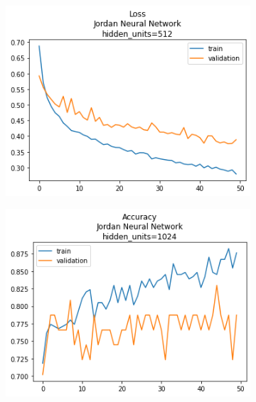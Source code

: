 \documentclass[12pt, a4paper]{article}
\begin{document}
\begin{figure}
\begin{subfigure}{0.45\linewidth}
    \end{subfigure}
    \hfill
    \begin{subfigure}{0.45\linewidth}
        \includegraphics[width=0.9\linewidth]{images/q1/jordan/loss_Jordan Neural Networkhidden_units=512.png}
    \end{subfigure}
    \begin{subfigure}{0.45\linewidth}
        \includegraphics[width=0.9\linewidth]{images/q1/jordan/acc_Jordan Neural Networkhidden_units=1024.png}
    \end{subfigure}
    \hfill
    \begin{subfigure}{0.45\linewidth}

\end{subfigure}
\end{figure}
\end{document}
